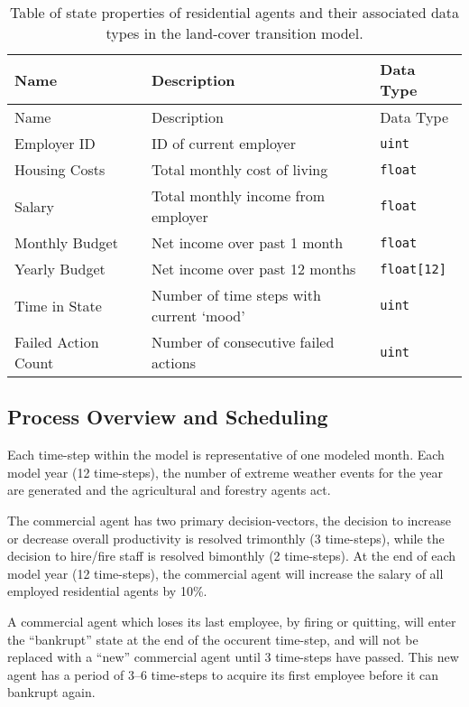 \begin{longtable}{lcp{.5\linewidth}l}
\caption{Table of state properties of residential agents and their
associated data types in the land-cover transition model.}
\label{tab:land_state_res} \\
\hline \hline
Name & & Description & Data Type \\ \hline
\endfirsthead
\hline \hline
Name & & Description & Data Type \\ \hline
\endhead
\hline\endfoot
Employer ID && ID of current employer & \tt{uint} \\
Housing Costs && Total monthly cost of living & \tt{float} \\
Salary && Total monthly income from employer & \tt{float} \\
Monthly Budget && Net income over past 1 month & \tt{float} \\
Yearly Budget && Net income over past 12 months & \tt{float[12]} \\
Time in State && Number of time steps with current `mood' & \tt{uint} \\
Failed Action Count && Number of consecutive failed actions & \tt{uint} \\
\end{longtable}

\subsection{Process Overview and Scheduling}

Each time-step within the model is representative of one modeled month.
Each model year (12 time-steps), the number of extreme weather events for the year are
generated and the agricultural and forestry agents act.

The commercial agent has two primary decision-vectors,
the decision to increase or decrease overall productivity is resolved trimonthly (3 time-steps),
while the decision to hire/fire staff is resolved bimonthly (2 time-steps).
At the end of each model year (12 time-steps), the commercial agent will increase the
salary of all employed residential agents by 10\%.

A commercial agent which loses its last employee,
by firing or quitting, will enter the ``bankrupt'' state at the end of
the occurent time-step, and will not be replaced with a ``new'' commercial agent until
3 time-steps have passed.
This new agent has a period of 3--6 time-steps to acquire its first employee before it
can bankrupt again.

